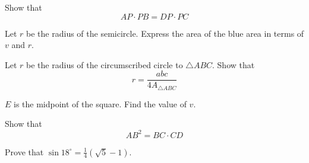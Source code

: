 Show that 
\[ AP\cdot PB = DP\cdot PC \]

\newpage
{}
Let $ r $ be the radius of the semicircle. Express the area of the blue area in terms of $ v $ and $ r $.

Let $ r $ be the radius of the circumscribed circle to $ \triangle ABC $. Show that
\[ r=\frac{abc}{4A_{\triangle ABC}} \]

$ E $ is the midpoint of the square. Find the value of $ v $.

\newpage
{}
Show that
\[ AB^2 = BC\cdot CD \]

Prove that $ \sin 18^\circ=\frac{1}{4}(\sqrt{5}-1) $.




